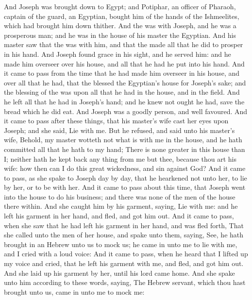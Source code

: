 \begin{biblechapter} %
 And Joseph was brought down to Egypt; and Potiphar, an officer of Pharaoh, captain of the guard, an Egyptian, bought him of the hands of the Ishmeelites, which had brought him down thither.
\verse And the \LORD was with Joseph, and he was a prosperous man; and he was in the house of his master the Egyptian.
\verse And his master saw that the \LORD was with him, and that the \LORD made all that he did to prosper in his hand.
\verse And Joseph found grace in his sight, and he served him: and he made him overseer over his house, and all that he had he put into his hand.
\verse And it came to pass from the time that he had made him overseer in his house, and over all that he had, that the \LORD blessed the Egyptian's house for Joseph's sake; and the blessing of the \LORD was upon all that he had in the house, and in the field.
\verse And he left all that he had in Joseph's hand; and he knew not ought he had, save the bread which he did eat. And Joseph was a goodly person, and well favoured.
\verse And it came to pass after these things, that his master's wife cast her eyes upon Joseph; and she said, Lie with me.
\verse But he refused, and said unto his master's wife, Behold, my master wotteth not what is with me in the house, and he hath committed all that he hath to my hand;
\verse There is none greater in this house than I; neither hath he kept back any thing from me but thee, because thou art his wife: how then can I do this great wickedness, and sin against God?
\verse And it came to pass, as she spake to Joseph day by day, that he hearkened not unto her, to lie by her, or to be with her.
\verse And it came to pass about this time, that Joseph went into the house to do his business; and there was none of the men of the house there within.
\verse And she caught him by his garment, saying, Lie with me: and he left his garment in her hand, and fled, and got him out.
\verse And it came to pass, when she saw that he had left his garment in her hand, and was fled forth,
\verse That she called unto the men of her house, and spake unto them, saying, See, he hath brought in an Hebrew unto us to mock us; he came in unto me to lie with me, and I cried with a loud voice:
\verse And it came to pass, when he heard that I lifted up my voice and cried, that he left his garment with me, and fled, and got him out.
\verse And she laid up his garment by her, until his lord came home.
\verse And she spake unto him according to these words, saying, The Hebrew servant, which thou hast brought unto us, came in unto me to mock me:

\end{biblechapter}
